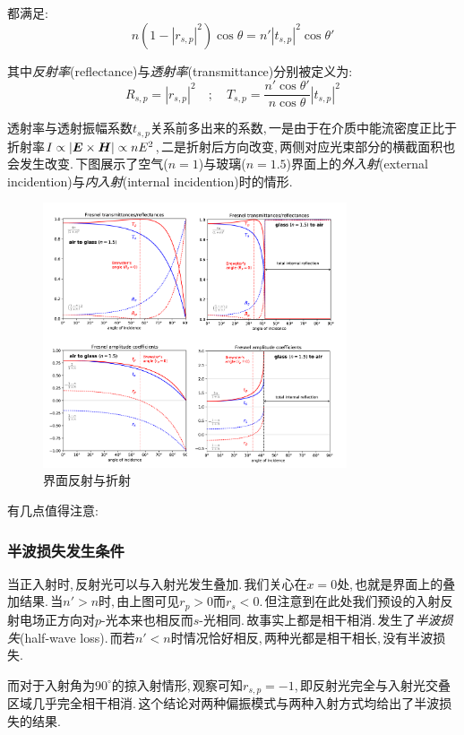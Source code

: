 都满足:
\[n(1-|r_{s,p}|^2)\cos\theta=n'|t_{s,p}|^2\cos\theta'\]

其中\emph{反射率}(reflectance)与\emph{透射率}(transmittance)分别被定义为:
\[R_{s,p}=|r_{s,p}|^2\quad;\quad T_{s,p}=\frac{n'\cos\theta'}{n\cos\theta}|t_{s,p}|^2\]

透射率与透射振幅系数\(t_{s,p}\)关系前多出来的系数,\,一是由于在介质中能流密度正比于折射率\(I\propto |\boldsymbol{E}\times\boldsymbol{H}|\propto nE^2\),\,二是折射后方向改变,\,两侧对应光束部分的横截面积也会发生改变.\,下图展示了空气(\(n=1\))与玻璃(\(n=1.5\))界面上的\emph{外入射}(external incidention)与\emph{内入射}(internal incidention)时的情形.
\begin{figure}[H]
\centering
\includegraphics[width=0.8\textwidth]{image/5-6-5.png}
\caption{界面反射与折射}
\end{figure}

有几点值得注意:

\subsubsection{\hei 半波损失发生条件}

当正入射时,\,反射光可以与入射光发生叠加.\,我们关心在$x=0$处,\,也就是界面上的叠加结果.\,当$n'>n$时,\,由上图可见\(r_p>0\)而\(r_s<0\).\,但注意到在此处我们预设的入射反射电场正方向对$p$-光本来也相反而$s$-光相同.\,故事实上都是相干相消.\,发生了\emph{半波损失}(half-wave loss).\,而若$n'<n$时情况恰好相反,\,两种光都是相干相长,\,没有半波损失.

而对于入射角为\(90^\circ\)的掠入射情形,\,观察可知\(r_{s,p}=-1\),\,即反射光完全与入射光交叠区域几乎完全相干相消.\,这个结论对两种偏振模式与两种入射方式均给出了半波损失的结果.

